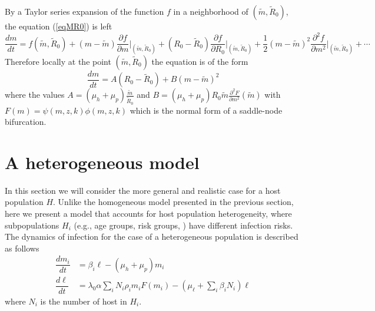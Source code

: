 \documentclass[12pt,a4paper]{article}
\theoremstyle{plain}%
\theoremstyle{definition}
\theoremstyle{remark}
\begin{document}
By a Taylor series expansion of the function $f$ in a neighborhood of $(\tilde m,\tilde R_0)$, the equation (\ref{eqMR0}) is left
\begin{equation}
{\scriptstyle	
	\frac{dm}{dt}=f(\tilde m,\tilde R_0)+(m-\tilde m)\frac{\partial f }{\partial m}\big\vert_{(\tilde m,\tilde R_0)}%
	+(R_0-\tilde R_0){\frac{\partial f }{\partial R_0}\big\vert_{(\tilde m,\tilde R_0)}}%
	+{\frac {1}{2}}(m-\tilde m)^2{\frac{\partial^2 f }{\partial m^2}}\big\vert_{(\tilde m,\tilde R_0)}%
	+\cdots 
}
\end{equation}
Therefore locally at the point $(\tilde m,\tilde R_0)$ the equation is of the form
\begin{equation}
\dfrac{dm}{dt}=A(R_0-\tilde R_0)+B(m-\tilde m)^2
\end{equation}
where the values $A=(\mu_h +\mu_p)\frac{\tilde m}{\tilde R_0}$ and $B=(\mu_h + \mu_p) R_0 \tilde m \frac{\partial^2 F}{\partial m^2}(\tilde m)$ with $F(m)= \psi(m,z,k)\phi(m,z, k)$
which is the normal form of a saddle-node bifurcation.


\section{A heterogeneous model}
In this section we will consider the more general and realistic case for a host population $H$. Unlike the homogeneous model presented in the previous section, here we present a model that accounts for host population heterogeneity, where subpopulations $H_i$ (e.g., age groups, risk groups, \cite{anderson1992infectious,anderson2014coverage,truscott2014modeling}) have different infection risks. The dynamics of infection for the case of a heterogeneous population is described as follows
\begin{equation}\label{model2}
	\begin{split}
		\dfrac{dm_i}{dt}&=\beta_i \ell - (\mu_h+\mu_p) m_i\\
		\dfrac{d\ell}{dt}&= 
		\lambda_0 \alpha
		\sum_i  N_i \rho_i  m_i F(m_i)   - (\mu_{\ell}+\sum_i \beta_i N_i ) \ell 
	\end{split}
\end{equation} 
where $N_{i}$ is the number of host in $H_i$.
\end{document}
